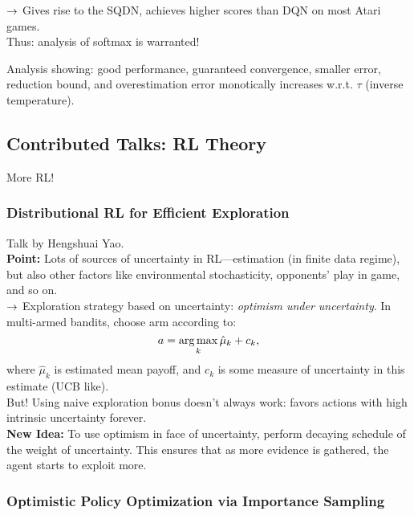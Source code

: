 $\rightarrow$ Gives rise to the SQDN, achieves higher scores than DQN on most Atari games. \\

Thus: analysis of softmax is warranted! \\

\begin{theorem}
Analysis showing: good performance, guaranteed convergence, smaller error, reduction bound, and overestimation error monotically increases w.r.t. $\tau$ (inverse temperature).
\end{theorem}

\spacerule
\subsection{Contributed Talks: RL Theory}

More RL!

\subsubsection{Distributional RL for Efficient Exploration}

Talk by Hengshuai Yao. \\

{\bf Point:} Lots of sources of uncertainty in RL---estimation (in finite data regime), but also other factors like environmental stochasticity, opponents' play in game, and so on. \\

$\rightarrow$ Exploration strategy based on uncertainty: {\it optimism under uncertainty}. In multi-armed bandits, choose arm according to:
\[
a = \operatorname*{arg\,max}_k \hat{\mu}_k + c_k,
\]
where $\hat{\mu}_k$ is estimated mean payoff, and $c_k$ is some measure of uncertainty in this estimate (UCB like). \\

But! Using naive exploration bonus doesn't always work: favors actions with high intrinsic uncertainty forever. \\

{\bf New Idea:} To use optimism in face of uncertainty, perform decaying schedule of the weight of uncertainty. This ensures that as more evidence is gathered, the agent starts to exploit more.
\spacerule

\subsubsection{Optimistic Policy Optimization via Importance Sampling}

